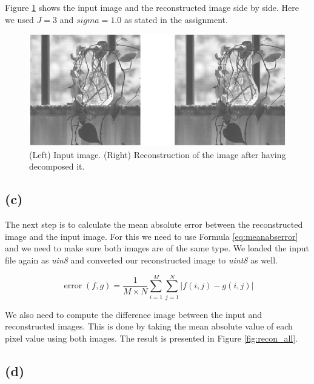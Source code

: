 \documentclass{article}
\begin{document}
Figure \ref{fig:2b} shows the input image and the reconstructed image side by side. Here we used $J = 3$ and $sigma = 1.0$ as stated in the assignment.

\begin{figure}[h]
    \centering
    \includegraphics[width=\textwidth]{Assignment_3/output_plots/IPpyr_recon_test_partial.png}
    \caption{(Left) Input image. (Right) Reconstruction of the image after having decomposed it.}
    \label{fig:2b}
\end{figure}

\subsection*{(c)}
The next step is to calculate the mean absolute error between the reconstructed image and the input image. For this we need to use Formula \ref{eq:meanabserror} and we need to make sure both images are of the same type. We loaded the input file again as \textit{uin8} and converted our reconstructed image to \textit{uint8} as well.

\begin{equation}\label{eq:meanabserror}
    \operatorname{error}(f, g)=\frac{1}{M \times N} \sum_{i=1}^{M} \sum_{j=1}^{N}|f(i, j)-g(i, j)|
\end{equation}

We also need to compute the difference image between the input and reconstructed images. This is done by taking the mean absolute value of each pixel value using both images. The result is presented in Figure \ref{fig:recon_all}.

\subsection*{(d)}
\end{document}
